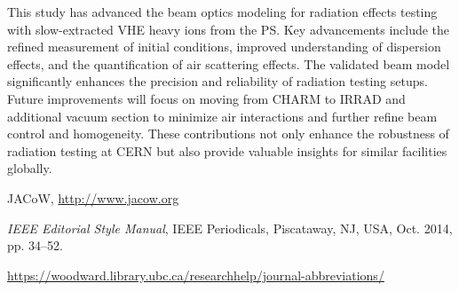 \documentclass[a4paper,
               biblatex,     %
               ]{jacow}
\begin{document}
This study has advanced the beam optics modeling for radiation effects testing with slow-extracted VHE heavy ions from the PS. Key advancements include the refined measurement of initial conditions, improved understanding of dispersion effects, and the quantification of air scattering effects. The validated beam model significantly enhances the precision and reliability of radiation testing setups. Future improvements will focus on moving from CHARM to IRRAD and additional vacuum section to minimize air interactions and further refine beam control and homogeneity. These contributions not only enhance the robustness of radiation testing at CERN but also provide valuable insights for similar facilities globally.


%
	{\printbibliography}%
	{%
	
	\begin{thebibliography}{9} %
	
		JACoW,
		\url{http://www.jacow.org}
	
		\textit{IEEE Editorial Style Manual},
		IEEE Periodicals, Piscataway,
		NJ, USA, Oct. 2014, pp. 34--52.

	\url{https://woodward.library.ubc.ca/researchhelp/journal-abbreviations/}

	\end{thebibliography}
} %
\end{document}

